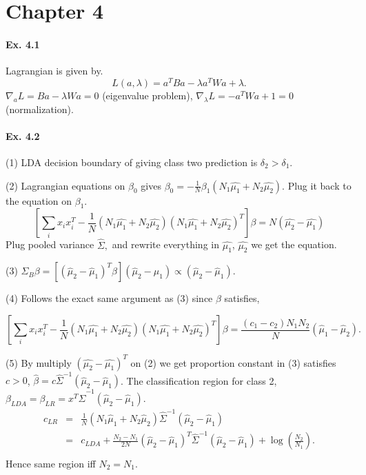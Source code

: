 \section*{Chapter 4}


\paragraph*{Ex. 4.1} Lagrangian is given by.
$$L(a, \lambda) = a^T B a - \lambda a^T W a + \lambda.$$
$\nabla _{a}L = Ba - \lambda Wa = 0$ (eigenvalue problem), $\nabla _{\lambda}L = - a^T W a + 1 = 0$ (normalization).

\paragraph*{Ex. 4.2}

(1) LDA decision boundary of giving class two prediction is $\delta_{2} > \delta_{1}.$

(2) Lagrangian equations on $\beta_{0}$ gives $\beta_{0} = -\frac{1}{N}\beta_{1}(N_1\hat{\mu_1} + N_2\hat{\mu_2}).$ Plug it back to the equation on $\beta_1$.
$$\left[\sum_{i}x_{i}x_{i}^T -\frac{1}{N}(N_1\hat{\mu_1} + N_2\hat{\mu_2})(N_1\hat{\mu_1} + N_2\hat{\mu_2})^T\right]\beta = N(\hat{\mu_2} - \hat{\mu_1})$$
Plug pooled variance $\hat{\Sigma},$ and rewrite everything in $\hat{\mu_1}$, $\hat{\mu_2}$ we get the equation.

(3) $\Sigma_{B}\beta = [(\hat{\mu}_2 - \hat{\mu}_1)^T\beta](\hat{\mu}_2 - \hat{\mu}_1)\propto(\hat{\mu}_2 - \hat{\mu}_1).$

(4) Follows the exact same argument as (3) since $\beta$ satisfies,

$$\left[\sum_{i}x_{i}x_{i}^T -\frac{1}{N}(N_1\hat{\mu_1} + N_2\hat{\mu_2})(N_1\hat{\mu_1} + N_2\hat{\mu_2})^T\right]\beta = \frac{(c_1 - c_2)N_1 N_2}{N}(\hat{\mu}_1 - \hat{\mu}_2).$$

(5) By multiply $(\hat{\mu_2}-\hat{\mu_1})^T$ on (2) we get proportion constant in (3) satisfies $c > 0$, $\hat{\beta} = c\hat{\Sigma}^{-1}(\hat{\mu}_2 - \hat{\mu}_1)$.
The classification region for class 2, $\beta_{LDA} = \beta_{LR} = x^T \hat{\Sigma}^{-1} (\hat{\mu}_2 - \hat{\mu}_1).$
\begin{eqnarray*}
c_{LR}&=&\frac{1}{N}(N_1\hat{\mu}_1 + N_2\hat{\mu}_2) \hat{\Sigma}^{-1} (\hat{\mu}_2 - \hat{\mu}_1)\\
      &=&c_{LDA} + \frac{N_2-N_1}{2N}(\hat{\mu}_2 - \hat{\mu}_1)^T\hat{\Sigma}^{-1}(\hat{\mu}_2 - \hat{\mu}_1) + \log(\frac{N_2}{N_1}).\\
\end{eqnarray*}
Hence same region iff $N_2 = N_1$.
